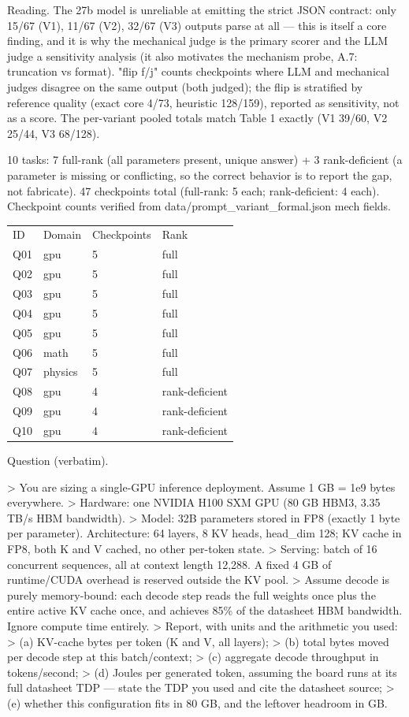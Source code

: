 \documentclass[10pt,twocolumn]{article}
\begin{document}
Reading. The 27b model is unreliable at emitting the strict JSON contract: only 15/67 (V1), 11/67 (V2), 32/67 (V3) outputs parse at all — this is itself a core finding, and it is why the mechanical judge is the primary scorer and the LLM judge a sensitivity analysis (it also motivates the mechanism probe, A.7: truncation vs format). "flip f/j" counts checkpoints where LLM and mechanical judges disagree on the same output (both judged); the flip is stratified by reference quality (exact core 4/73, heuristic 128/159), reported as sensitivity, not as a score. The per-variant pooled totals match Table 1 exactly (V1 39/60, V2 25/44, V3 68/128).


10 tasks: 7 full-rank (all parameters present, unique answer) + 3 rank-deficient (a parameter is missing or conflicting, so the correct behavior is to report the gap, not fabricate). 47 checkpoints total (full-rank: 5 each; rank-deficient: 4 each). Checkpoint counts verified from data/prompt\_variant\_formal.json mech fields.


\begin{table}[h]
\centering
\begin{tabular}{llll}
ID & Domain & Checkpoints & Rank \\
Q01 & gpu & 5 & full \\
Q02 & gpu & 5 & full \\
Q03 & gpu & 5 & full \\
Q04 & gpu & 5 & full \\
Q05 & gpu & 5 & full \\
Q06 & math & 5 & full \\
Q07 & physics & 5 & full \\
Q08 & gpu & 4 & rank-deficient \\
Q09 & gpu & 4 & rank-deficient \\
Q10 & gpu & 4 & rank-deficient
\end{tabular}
\end{table}


Question (verbatim).


> You are sizing a single-GPU inference deployment. Assume 1 GB = 1e9 bytes everywhere. > Hardware: one NVIDIA H100 SXM GPU (80 GB HBM3, 3.35 TB/s HBM bandwidth). > Model: 32B parameters stored in FP8 (exactly 1 byte per parameter). Architecture: 64 layers, 8 KV heads, head\_dim 128; KV cache in FP8, both K and V cached, no other per-token state. > Serving: batch of 16 concurrent sequences, all at context length 12,288. A fixed 4 GB of runtime/CUDA overhead is reserved outside the KV pool. > Assume decode is purely memory-bound: each decode step reads the full weights once plus the entire active KV cache once, and achieves 85\% of the datasheet HBM bandwidth. Ignore compute time entirely. > Report, with units and the arithmetic you used: > (a) KV-cache bytes per token (K and V, all layers); > (b) total bytes moved per decode step at this batch/context; > (c) aggregate decode throughput in tokens/second; > (d) Joules per generated token, assuming the board runs at its full datasheet TDP — state the TDP you used and cite the datasheet source; > (e) whether this configuration fits in 80 GB, and the leftover headroom in GB.
\end{document}
